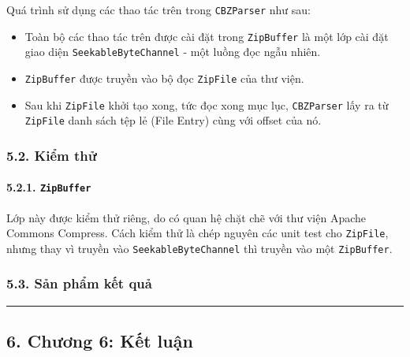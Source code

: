 \documentclass[
]{article}
\begin{document}
Quá trình sử dụng các thao tác trên trong \texttt{CBZParser} như sau:

\begin{itemize}
\item
  Toàn bộ các thao tác trên được cài đặt trong \texttt{ZipBuffer} là một
  lớp cài đặt giao diện \texttt{SeekableByteChannel} - một luồng đọc
  ngẫu nhiên.
\item
  \texttt{ZipBuffer} được truyền vào bộ đọc \texttt{ZipFile} của thư
  viện.
\item
  Sau khi \texttt{ZipFile} khởi tạo xong, tức đọc xong mục lục,
  \texttt{CBZParser} lấy ra từ \texttt{ZipFile} danh sách tệp lẻ (File
  Entry) cùng với offset của nó.
\end{itemize}

\hypertarget{kiux1ec3m-thux1eed}{%
\subsubsection{\texorpdfstring{5.2. Kiểm thử
}{5.2. Kiểm thử }}\label{kiux1ec3m-thux1eed}}

\hypertarget{zipbuffer}{%
\paragraph{\texorpdfstring{5.2.1.
\texttt{ZipBuffer}}{5.2.1. ZipBuffer}}\label{zipbuffer}}

Lớp này được kiểm thử riêng, do có quan hệ chặt chẽ với thư viện Apache
Commons Compress. Cách kiểm thử là chép nguyên các unit test cho
\texttt{ZipFile}, nhưng thay vì truyền vào \texttt{SeekableByteChannel}
thì truyền vào một \texttt{ZipBuffer}.

\hypertarget{sux1ea3n-phux1ea9m-kux1ebft-quux1ea3}{%
\subsubsection{\texorpdfstring{5.3. Sản phẩm kết quả
}{5.3. Sản phẩm kết quả }}\label{sux1ea3n-phux1ea9m-kux1ebft-quux1ea3}}

\begin{center}\rule{0.5\linewidth}{0.5pt}\end{center}

\hypertarget{chux1b0ux1a1ng-6-kux1ebft-luux1eadn}{%
\subsection{\texorpdfstring{6. Chương 6: Kết luận
}{6. Chương 6: Kết luận }}\label{chux1b0ux1a1ng-6-kux1ebft-luux1eadn}}
\end{document}
